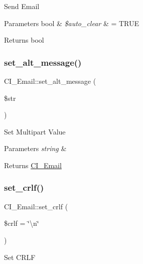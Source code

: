 Send Email


\begin{DoxyParams}[1]{Parameters}
bool & {\em \$auto\+\_\+clear} & = T\+R\+UE \\
\hline
\end{DoxyParams}
\begin{DoxyReturn}{Returns}
bool 
\end{DoxyReturn}
\mbox{\label{class_c_i___email_a62b950aaae2d043d96dfa0cbfdf0043f}} 
\subsubsection{\texorpdfstring{set\+\_\+alt\+\_\+message()}{set\_alt\_message()}}
{\footnotesize\ttfamily C\+I\+\_\+\+Email\+::set\+\_\+alt\+\_\+message (\begin{DoxyParamCaption}\item[{}]{\$str }\end{DoxyParamCaption})}

Set Multipart Value


\begin{DoxyParams}{Parameters}
{\em string} & \\
\hline
\end{DoxyParams}
\begin{DoxyReturn}{Returns}
\mbox{\hyperlink{class_c_i___email}{C\+I\+\_\+\+Email}} 
\end{DoxyReturn}
\mbox{\label{class_c_i___email_a6dfb979e61ae39ae59c332c693925850}} 
\subsubsection{\texorpdfstring{set\+\_\+crlf()}{set\_crlf()}}
{\footnotesize\ttfamily C\+I\+\_\+\+Email\+::set\+\_\+crlf (\begin{DoxyParamCaption}\item[{}]{\$crlf = {\ttfamily \char`\"{}\textbackslash{}n\char`\"{}} }\end{DoxyParamCaption})}

Set C\+R\+LF


